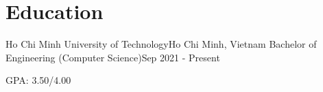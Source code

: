 \section{\textbf{Education}}
\vspace{-0.4mm}
\resumeSubHeadingListStart

\resumeSubheading
{Ho Chi Minh University of Technology}{Ho Chi Minh, Vietnam}
{Bachelor of Engineering (Computer Science)}{Sep 2021 - Present}
\resumeItemListStart
\item GPA: 3.50/4.00
\resumeItemListEnd



\resumeSubHeadingListEnd
\vspace{-6mm}